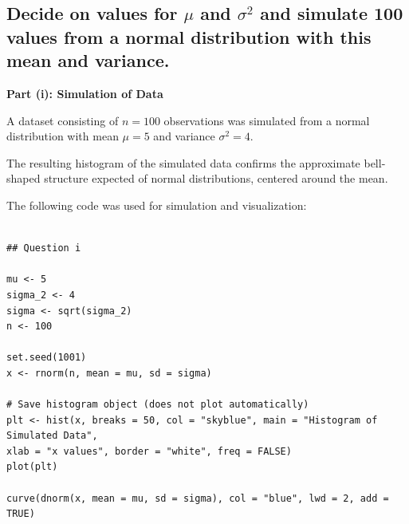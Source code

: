 \documentclass[]{article}
\begin{document}
%
%
%
%
%
%
%
%
%
%
%
%	
%
%


\subsection{Decide on values for $\mu$ and $\sigma^2$ and simulate 100 values from a normal distribution with this mean and variance.}


\noindent \textbf{Part (i): Simulation of Data}

A dataset consisting of $n = 100$ observations was simulated from a normal distribution with mean $\mu = 5$ and variance $\sigma^2 = 4$. 

The resulting histogram of the simulated data confirms the approximate bell-shaped structure expected of normal distributions, centered around the mean.

The following code was used for simulation and visualization:

\begin{lstlisting}

## Question i

mu <- 5
sigma_2 <- 4
sigma <- sqrt(sigma_2)
n <- 100

set.seed(1001)
x <- rnorm(n, mean = mu, sd = sigma)

# Save histogram object (does not plot automatically)
plt <- hist(x, breaks = 50, col = "skyblue", main = "Histogram of Simulated Data",
xlab = "x values", border = "white", freq = FALSE)
plot(plt)

curve(dnorm(x, mean = mu, sd = sigma), col = "blue", lwd = 2, add = TRUE)
\end{lstlisting}
\end{document}
